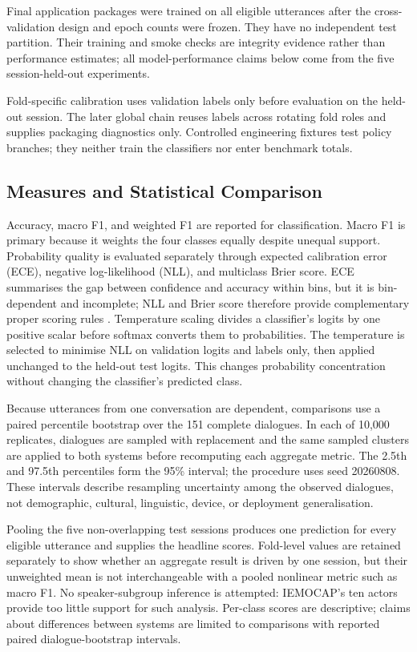 Final application packages were trained on all eligible utterances after the cross-validation design and epoch counts were frozen. They have no independent test partition. Their training and smoke checks are integrity evidence rather than performance estimates; all model-performance claims below come from the five session-held-out experiments.

Fold-specific calibration uses validation labels only before evaluation on the held-out session. The later global chain reuses labels across rotating fold roles and supplies packaging diagnostics only. Controlled engineering fixtures test policy branches; they neither train the classifiers nor enter benchmark totals.

\subsection{Measures and Statistical Comparison}
\label{subsec:evaluation-measures}

Accuracy, macro F1, and weighted F1 are reported for classification. Macro F1 is primary because it weights the four classes equally despite unequal support. Probability quality is evaluated separately through expected calibration error (ECE), negative log-likelihood (NLL), and multiclass Brier score. ECE summarises the gap between confidence and accuracy within bins, but it is bin-dependent and incomplete; NLL and Brier score therefore provide complementary proper scoring rules \cite{guo2017calibration,kull2019dirichlet}. Temperature scaling divides a classifier's logits by one positive scalar before softmax converts them to probabilities. The temperature is selected to minimise NLL on validation logits and labels only, then applied unchanged to the held-out test logits. This changes probability concentration without changing the classifier's predicted class.

Because utterances from one conversation are dependent, comparisons use a paired percentile bootstrap over the 151 complete dialogues. In each of 10,000 replicates, dialogues are sampled with replacement and the same sampled clusters are applied to both systems before recomputing each aggregate metric. The 2.5th and 97.5th percentiles form the 95\% interval; the procedure uses seed 20260808. These intervals describe resampling uncertainty among the observed dialogues, not demographic, cultural, linguistic, device, or deployment generalisation.

Pooling the five non-overlapping test sessions produces one prediction for every eligible utterance and supplies the headline scores. Fold-level values are retained separately to show whether an aggregate result is driven by one session, but their unweighted mean is not interchangeable with a pooled nonlinear metric such as macro F1. No speaker-subgroup inference is attempted: IEMOCAP's ten actors provide too little support for such analysis. Per-class scores are descriptive; claims about differences between systems are limited to comparisons with reported paired dialogue-bootstrap intervals.

